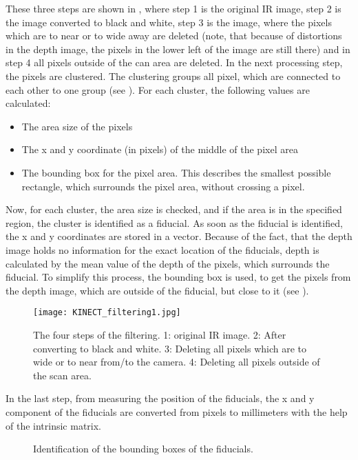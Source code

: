 These three steps are shown in , where step 1 is the original IR image, step 2 is the image converted to black and white, step 3 is the image, where the pixels which are to near or to wide away are deleted (note, that because of distortions in the depth image, the pixels in the lower left of the image are still there) and in step 4 all pixels outside of the can area are deleted.
In the next processing step, the pixels are clustered. The clustering groups all pixel, which are connected to each other to one group (see ). For each cluster, the following values are calculated:
\begin{itemize}
\item The area size of the pixels
\item The x and y coordinate (in pixels) of the middle of the pixel area
\item The bounding box for the pixel area. This describes the smallest possible rectangle,   
 which surrounds the pixel area, without crossing a pixel.
\end{itemize}
Now, for each cluster, the area size is checked, and if the area is in the specified region, the cluster is identified as a fiducial. As soon as the fiducial is identified, the x and y coordinates are stored in a vector. Because of the fact, that the depth image holds no information for the exact location of the fiducials, depth is calculated by the mean value of the depth of the pixels, which surrounds the fiducial. To simplify this process, the bounding box is used, to get the pixels from the depth image, which are outside of the fiducial, but close to it (see ).
\begin{figure}[!t]
\centering
\texttt{[image: KINECT\_filtering1.jpg]}
\caption{The four steps of the filtering. 1: original IR image. 2: After converting to black and white. 3: Deleting all pixels which are to wide or to near from/to the camera. 4: Deleting all pixels outside of the scan area.}
\label{fig:KINECT_filtering1}
\end{figure}
In the last step, from measuring the position of the fiducials, the x and y component of the fiducials are converted from pixels to millimeters with the help of the intrinsic matrix. 
\begin{figure}[!t]
\centering
{}
\hfil
{}
\caption{Identification of the bounding boxes of the fiducials.}
\label{fig:merged}
\end{figure}

